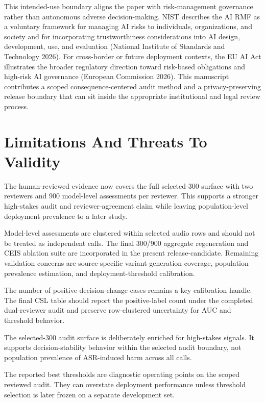 \documentclass[
]{article}
\begin{document}
This intended-use boundary aligns the paper with risk-management
governance rather than autonomous adverse decision-making. NIST
describes the AI RMF as a voluntary framework for managing AI risks to
individuals, organizations, and society and for incorporating
trustworthiness considerations into AI design, development, use, and
evaluation (National Institute of Standards and Technology 2026). For
cross-border or future deployment contexts, the EU AI Act illustrates
the broader regulatory direction toward risk-based obligations and
high-risk AI governance (European Commission 2026). This manuscript
contributes a scoped consequence-centered audit method and a
privacy-preserving release boundary that can sit inside the appropriate
institutional and legal review process.

\hypertarget{limitations-and-threats-to-validity}{%
\section{Limitations And Threats To
Validity}\label{limitations-and-threats-to-validity}}

The human-reviewed evidence now covers the full selected-300 surface
with two reviewers and 900 model-level assessments per reviewer. This
supports a stronger high-stakes audit and reviewer-agreement claim while
leaving population-level deployment prevalence to a later study.

Model-level assessments are clustered within selected audio rows and
should not be treated as independent calls. The final 300/900 aggregate
regeneration and CEIS ablation suite are incorporated in the present
release-candidate. Remaining validation concerns are source-specific
variant-generation coverage, population-prevalence estimation, and
deployment-threshold calibration.

The number of positive decision-change cases remains a key calibration
handle. The final CSL table should report the positive-label count under
the completed dual-reviewer audit and preserve row-clustered uncertainty
for AUC and threshold behavior.

The selected-300 audit surface is deliberately enriched for high-stakes
signals. It supports decision-stability behavior within the selected
audit boundary, not population prevalence of ASR-induced harm across all
calls.

The reported best thresholds are diagnostic operating points on the
scoped reviewed audit. They can overstate deployment performance unless
threshold selection is later frozen on a separate development set.
\end{document}
